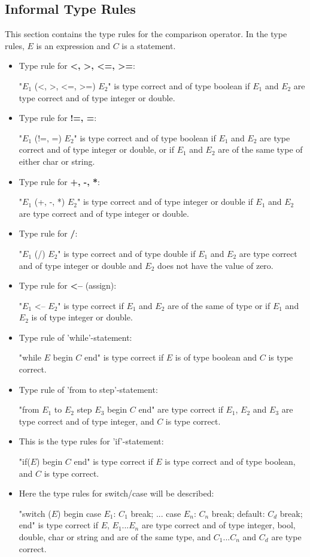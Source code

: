 \subsection{Informal Type Rules}
This section contains the type rules for the comparison operator. In the type rules, $E$ is an expression and $C$ is a statement.
\begin{itemize}
\item Type rule for \textbf{<, >, <=, >=}:

"$E_1$ (<, >, <=, >=) $E_2$" is type correct and of type boolean if $E_1$ and $E_2$ are type correct and of type integer or double.

\item Type rule for \textbf{!=, =}:

"$E_1$ (!=, =) $E_2$" is type correct and of type boolean if $E_1$ and $E_2$ are type correct and of type integer or double, or if $E_1$ and $E_2$ are of the same type of either char or string.

\item Type rule for \textbf{+, -, *}:

"$E_1$ (+, -, *) $E_2$" is type correct and of type integer or double if $E_1$ and $E_2$ are type correct and of type integer or double.

\item Type rule for \textbf{/}:

"$E_1$ (/) $E_2$" is type correct and of type double if $E_1$ and $E_2$ are type correct and of type integer or double and $E_2$ does not have the value of zero.

\item Type rule for \textbf{<--} (assign):

"$E_1$ <-- $E_2$" is type correct if $E_1$ and $E_2$ are of the same of type or if $E_1$ and $E_2$ is of type integer or double.

\item Type rule of 'while'-statement: 

"while $E$ begin $C$ end" is type correct if $E$ is of type boolean and $C$ is type correct.

\item Type rule of 'from to step'-statement: 

"from $E_1$ to $E_2$ step $E_3$ begin $C$ end" are type correct if $E_1$, $E_2$ and $E_3$ are type correct and of type integer, and $C$ is type correct.

\item This is the type rules for 'if'-statement:

"if($E$) begin $C$ end" is type correct if $E$ is type correct and of type boolean, and $C$ is type correct.

\item Here the type rules for switch/case will be described:

"switch ($E$) begin case $E_1$: $C_1$ break; ... case $E_n$: $C_n$ break; default: $C_d$ break; end" is type correct if $E$, $E_1$...$E_n$ are type correct and of type integer, bool, double, char or string and are of the same type, and $C_1$...$C_n$ and $C_d$ are type correct.
\end{itemize}